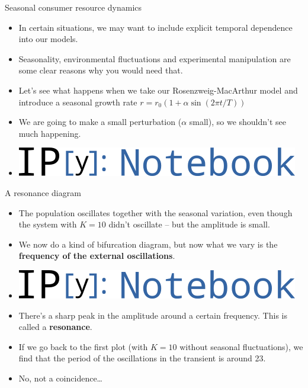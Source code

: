 \documentclass{beamer}
\begin{document}
\begin{frame}{Seasonal consumer resource dynamics}
    \begin{itemize}
        \item In certain situations, we may want to include explicit temporal
            dependence into our models.
        \item Seasonality, environmental fluctuations and experimental
            manipulation are some clear reasons why you would need that.
        \item Let's see what happens when we take our Rosenzweig-MacArthur
            model and introduce a seasonal growth rate $r = r_0 (1+\alpha
            \sin(2\pi t/T))$ 
        \item We are going to make a small perturbation ($\alpha$ small), so
            we shouldn't see much happening.
        \item
            \includegraphics[height=1.5ex]{ipynblogo.png}
    \end{itemize}
\end{frame}

\begin{frame}{A resonance diagram}
    \begin{itemize}
        \item The population oscillates together with the seasonal variation,
            even though the system with $K=10$ didn't oscillate -- but the
            amplitude is small.
        \item We now do a kind of bifurcation diagram, but now what we vary is
            the \textbf{frequency of the external oscillations}.
        \item
            \includegraphics[height=1.5ex]{ipynblogo.png}
            \pause
        \item There's a sharp peak in the amplitude around a certain
            frequency. This is called a \textbf{resonance}.
        \item If we go back to the first plot (with $K=10$ without seasonal
            fluctuations), we find that the period of the oscillations in the
            transient is around 23.
        \item No, not a coincidence\ldots
    \end{itemize}
\end{frame}
\end{document}
